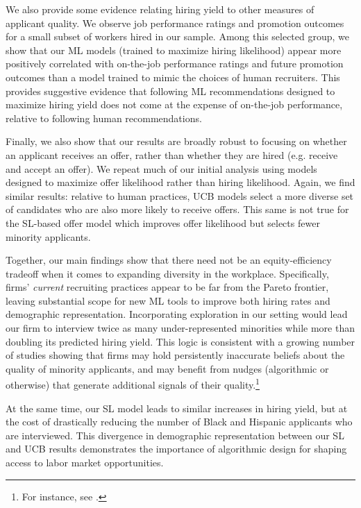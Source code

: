 \documentclass[crop,noquery,editorname,historyrev,nosurname,runningno,sepcount]{RESTUD}
\begin{document}
We also provide some evidence relating hiring yield to other measures of applicant quality.  We observe job performance ratings and promotion outcomes for a small subset of workers hired in our sample.  Among this selected group, we show that our ML models (trained to maximize hiring likelihood) appear more positively correlated with on-the-job performance ratings and future promotion outcomes than a model trained to mimic the choices of human recruiters.  This provides suggestive evidence that following ML recommendations designed to maximize hiring yield does not come at the expense of on-the-job performance, relative to following human recommendations.  

Finally, we also show that our results are broadly robust to focusing on whether an applicant receives an offer, rather than whether they are hired (e.g. receive and accept an offer).  We repeat much of our initial analysis using models designed to maximize offer likelihood rather than hiring likelihood.  Again, we find similar results: relative to human practices, UCB models select a more diverse set of candidates who are also more likely to receive offers.  This same is not true for the SL-based offer model which improves offer likelihood but selects fewer minority applicants.  

Together, our main findings show that there need not be an equity-efficiency tradeoff when it comes to expanding diversity in the workplace.  Specifically, firms' \textit{current} recruiting practices appear to be far from the Pareto frontier, leaving substantial scope for new ML tools to improve both hiring rates and demographic representation.  Incorporating exploration in our setting would lead our firm to interview twice as many under-represented minorities while more than doubling its predicted hiring yield.   This logic is consistent with a growing number of studies showing that firms may hold persistently inaccurate beliefs about the quality of minority applicants, and may benefit from nudges (algorithmic or otherwise) that generate additional signals of their quality.\footnote{For instance, see \citet{conradjmp, bohren1, bohren2, lepage, lepageexp}.}

At the same time, our SL model leads to similar increases in hiring yield, but at the cost of drastically reducing the number of Black and Hispanic applicants who are interviewed.  This divergence in demographic representation between our SL and UCB results demonstrates the importance of algorithmic design for shaping access to labor market opportunities.
\end{document}
